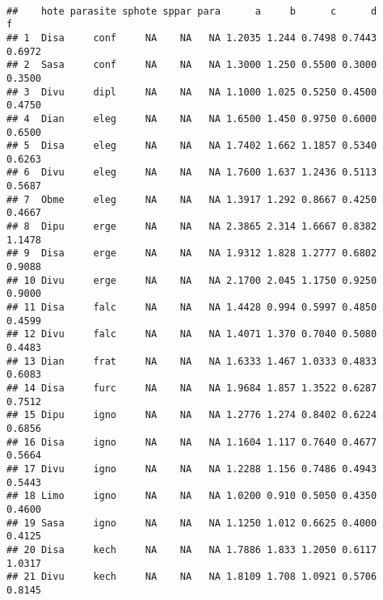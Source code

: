 \begin{knitrout}
\color{fgcolor}\begin{kframe}
\begin{flushleft}
\ttfamily\noindent
{}\hlkeyword{(}\hlkeyword{,}{\ }\hlargument{=}{\ }\hlkeyword{(}\hlargument{=}{\ }\hlkeyword{\usebox{\hlnormalsizeboxdollar}}\hlkeyword{,}{\ }\hlargument{=}{\ }\hlkeyword{\usebox{\hlnormalsizeboxdollar}}\hlkeyword{)}\hlkeyword{,}\hspace*{\fill}\\
\hlstd{}{\ }{\ }{\ }{\ }\hlkeyword{,}{\ }\hlargument{=}{\ }\hlkeyword{)}\mbox{}
\normalfont
\end{flushleft}
\begin{verbatim}
##    hote parasite sphote sppar para      a     b      c      d      f
## 1  Disa     conf     NA    NA   NA 1.2035 1.244 0.7498 0.7443 0.6972
## 2  Sasa     conf     NA    NA   NA 1.3000 1.250 0.5500 0.3000 0.3500
## 3  Divu     dipl     NA    NA   NA 1.1000 1.025 0.5250 0.4500 0.4750
## 4  Dian     eleg     NA    NA   NA 1.6500 1.450 0.9750 0.6000 0.6500
## 5  Disa     eleg     NA    NA   NA 1.7402 1.662 1.1857 0.5340 0.6263
## 6  Divu     eleg     NA    NA   NA 1.7600 1.637 1.2436 0.5113 0.5687
## 7  Obme     eleg     NA    NA   NA 1.3917 1.292 0.8667 0.4250 0.4667
## 8  Dipu     erge     NA    NA   NA 2.3865 2.314 1.6667 0.8382 1.1478
## 9  Disa     erge     NA    NA   NA 1.9312 1.828 1.2777 0.6802 0.9088
## 10 Divu     erge     NA    NA   NA 2.1700 2.045 1.1750 0.9250 0.9000
## 11 Disa     falc     NA    NA   NA 1.4428 0.994 0.5997 0.4850 0.4599
## 12 Divu     falc     NA    NA   NA 1.4071 1.370 0.7040 0.5080 0.4483
## 13 Dian     frat     NA    NA   NA 1.6333 1.467 1.0333 0.4833 0.6083
## 14 Disa     furc     NA    NA   NA 1.9684 1.857 1.3522 0.6287 0.7512
## 15 Dipu     igno     NA    NA   NA 1.2776 1.274 0.8402 0.6224 0.6856
## 16 Disa     igno     NA    NA   NA 1.1604 1.117 0.7640 0.4677 0.5664
## 17 Divu     igno     NA    NA   NA 1.2288 1.156 0.7486 0.4943 0.5443
## 18 Limo     igno     NA    NA   NA 1.0200 0.910 0.5050 0.4350 0.4600
## 19 Sasa     igno     NA    NA   NA 1.1250 1.012 0.6625 0.4000 0.4125
## 20 Disa     kech     NA    NA   NA 1.7886 1.833 1.2050 0.6117 1.0317
## 21 Divu     kech     NA    NA   NA 1.8109 1.708 1.0921 0.5706 0.8145

\end{verbatim}
\end{kframe}
\end{knitrout}
